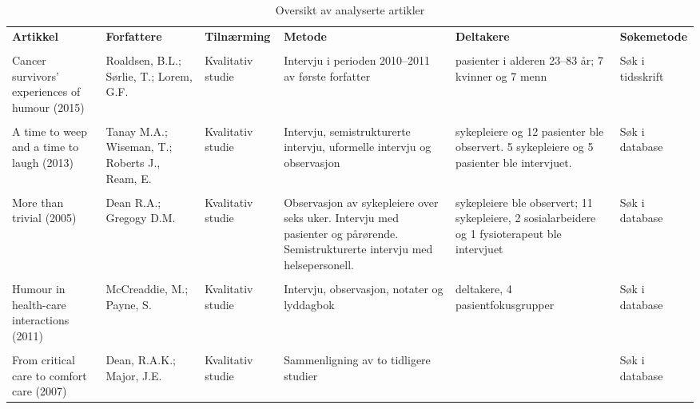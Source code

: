 \begin{landscape}
  \begin{table}
    \centering
    \small
    \begin{tabularx}{\paperwidth}{
        >{\raggedright\arraybackslash}X
        >{\raggedright\arraybackslash}X
        l
        >{\raggedright\arraybackslash}X
        >{\raggedright\arraybackslash}X
        l}
      \textbf{Artikkel} &
      \textbf{Forfattere} &
      \textbf{Tilnærming} &
      \textbf{Metode} &
      \textbf{Deltakere} &
      \textbf{Søkemetode}
      \\ \\
      Cancer survivors’ experiences of humour (2015) &
      Roaldsen, B.L.; S{\o}rlie, T.; Lorem, G.F. &
      Kvalitativ studie &
      Intervju i perioden 2010--2011 av første forfatter &
      14 pasienter i alderen 23--83 år; 7 kvinner og 7 menn &
      Søk i tidsskrift
      \\ \\
      A time to weep and a time to laugh (2013) &
      Tanay M.A.; Wiseman, T.; Roberts J., Ream, E. &
      Kvalitativ studie &
      Intervju, semistrukturerte intervju, uformelle intervju og observasjon &
      9 sykepleiere og 12 pasienter ble observert. 5 sykepleiere og 5 pasienter ble intervjuet. &
      Søk i database
      \\ \\
      More than trivial (2005) &
      Dean R.A.; Gregogy D.M. &
      Kvalitativ studie &
      Observasjon av sykepleiere over seks uker. Intervju med
      pasienter og pårørende. Semistrukturerte intervju med helsepersonell. &
      6 sykepleiere ble observert; 11 sykepleiere, 2
      sosialarbeidere og 1 fysioterapeut ble intervjuet &
      Søk i database
      \\ \\
      Humour in health-care interactions (2011) &
      McCreaddie, M.; Payne, S. &
      Kvalitativ studie &
      Intervju, observasjon, notater og lyddagbok &
      32 deltakere, 4 pasientfokusgrupper &
      Søk i database
      \\ \\
      From critical care to comfort care (2007) &
      Dean, R.A.K.; Major, J.E. &
      Kvalitativ studie &
      Sammenligning av to tidligere studier &
      &
      Søk i database
    \end{tabularx}
    \label{tabell.artikler}
    \caption{Oversikt av analyserte artikler}
  \end{table}
\end{landscape}
